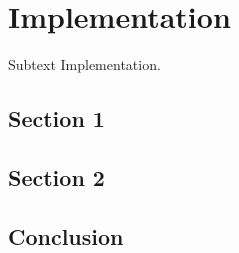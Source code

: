 \chapter{Implementation}
\label{chap:implementation}

Subtext Implementation.

\minitoc

\newpage

\section{Section 1}



\section{Section 2}



\section{Conclusion}


